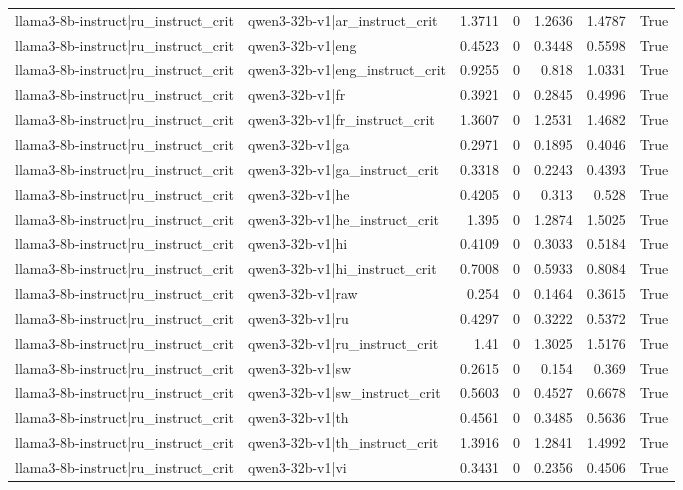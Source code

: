 \begin{table}
\begin{tabular}{l l r r r r l}
llama3-8b-instruct|ru_instruct_crit & qwen3-32b-v1|ar_instruct_crit & 1.3711 & 0 & 1.2636 & 1.4787 & True \\
llama3-8b-instruct|ru_instruct_crit & qwen3-32b-v1|eng & 0.4523 & 0 & 0.3448 & 0.5598 & True \\
llama3-8b-instruct|ru_instruct_crit & qwen3-32b-v1|eng_instruct_crit & 0.9255 & 0 & 0.818 & 1.0331 & True \\
llama3-8b-instruct|ru_instruct_crit & qwen3-32b-v1|fr & 0.3921 & 0 & 0.2845 & 0.4996 & True \\
llama3-8b-instruct|ru_instruct_crit & qwen3-32b-v1|fr_instruct_crit & 1.3607 & 0 & 1.2531 & 1.4682 & True \\
llama3-8b-instruct|ru_instruct_crit & qwen3-32b-v1|ga & 0.2971 & 0 & 0.1895 & 0.4046 & True \\
llama3-8b-instruct|ru_instruct_crit & qwen3-32b-v1|ga_instruct_crit & 0.3318 & 0 & 0.2243 & 0.4393 & True \\
llama3-8b-instruct|ru_instruct_crit & qwen3-32b-v1|he & 0.4205 & 0 & 0.313 & 0.528 & True \\
llama3-8b-instruct|ru_instruct_crit & qwen3-32b-v1|he_instruct_crit & 1.395 & 0 & 1.2874 & 1.5025 & True \\
llama3-8b-instruct|ru_instruct_crit & qwen3-32b-v1|hi & 0.4109 & 0 & 0.3033 & 0.5184 & True \\
llama3-8b-instruct|ru_instruct_crit & qwen3-32b-v1|hi_instruct_crit & 0.7008 & 0 & 0.5933 & 0.8084 & True \\
llama3-8b-instruct|ru_instruct_crit & qwen3-32b-v1|raw & 0.254 & 0 & 0.1464 & 0.3615 & True \\
llama3-8b-instruct|ru_instruct_crit & qwen3-32b-v1|ru & 0.4297 & 0 & 0.3222 & 0.5372 & True \\
llama3-8b-instruct|ru_instruct_crit & qwen3-32b-v1|ru_instruct_crit & 1.41 & 0 & 1.3025 & 1.5176 & True \\
llama3-8b-instruct|ru_instruct_crit & qwen3-32b-v1|sw & 0.2615 & 0 & 0.154 & 0.369 & True \\
llama3-8b-instruct|ru_instruct_crit & qwen3-32b-v1|sw_instruct_crit & 0.5603 & 0 & 0.4527 & 0.6678 & True \\
llama3-8b-instruct|ru_instruct_crit & qwen3-32b-v1|th & 0.4561 & 0 & 0.3485 & 0.5636 & True \\
llama3-8b-instruct|ru_instruct_crit & qwen3-32b-v1|th_instruct_crit & 1.3916 & 0 & 1.2841 & 1.4992 & True \\
llama3-8b-instruct|ru_instruct_crit & qwen3-32b-v1|vi & 0.3431 & 0 & 0.2356 & 0.4506 & True \\

\end{tabular}
\end{table}
